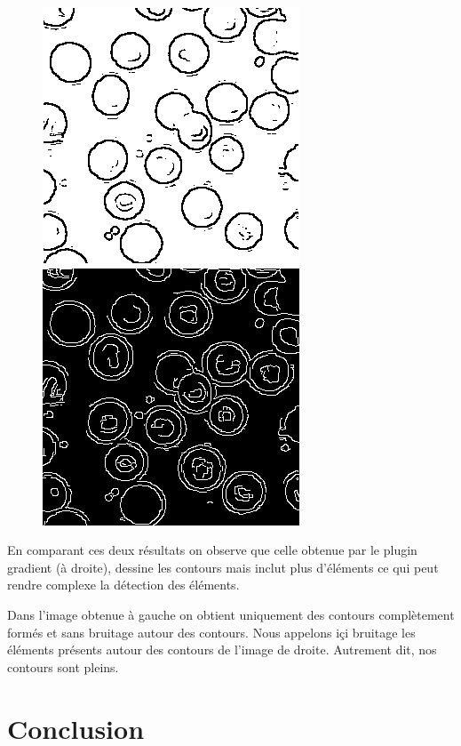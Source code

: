 \documentclass[a4paper,12pt]{report}
\begin{document}
\begin{figure}[!ht]
	\center	
	\includegraphics[scale=0.5]{image/q10.png}
	\includegraphics[scale=0.5]{image/q11.png}
\end{figure}

En comparant ces deux résultats on observe que celle obtenue par le plugin gradient (à droite), dessine les contours mais inclut plus d'éléments ce qui peut rendre complexe la détection des éléments.

Dans l'image obtenue à gauche on obtient uniquement des contours complètement formés et sans bruitage autour des contours. Nous appelons içi bruitage les éléments présents autour des contours de l'image de droite. Autrement dit, nos contours sont pleins.

\newpage

\section*{Conclusion}
\end{document}
